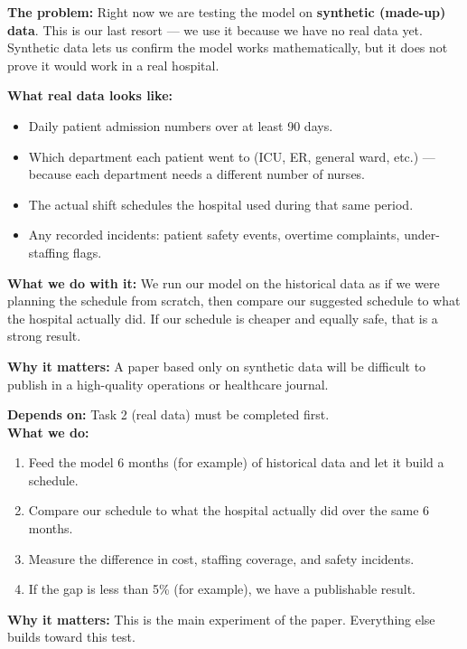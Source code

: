 \documentclass[12pt,a4paper]{article}
\begin{document}
\vspace{6pt}
\begin{warnbox}
\textbf{The problem:} Right now we are testing the model on \textbf{synthetic (made-up) data}. This is our last resort — we use it because we have no real data yet. Synthetic data lets us confirm the model works mathematically, but it does not prove it would work in a real hospital.

\textbf{What real data looks like:}
\begin{itemize}[itemsep=2pt]
  \item Daily patient admission numbers over at least 90 days.
  \item Which department each patient went to (ICU, ER, general ward, etc.) — because each department needs a different number of nurses.
  \item The actual shift schedules the hospital used during that same period.
  \item Any recorded incidents: patient safety events, overtime complaints, under-staffing flags.
\end{itemize}

\textbf{What we do with it:} We run our model on the historical data as if we were planning the schedule from scratch, then compare our suggested schedule to what the hospital actually did. If our schedule is cheaper and equally safe, that is a strong result.

\textbf{Why it matters:} A paper based only on synthetic data will be difficult to publish in a high-quality operations or healthcare journal.\\
\end{warnbox}

\vspace{6pt}
\begin{warnbox}
\textbf{Depends on:} Task 2 (real data) must be completed first.\\[4pt]
\textbf{What we do:}
\begin{enumerate}[itemsep=2pt]
  \item Feed the model 6 months (for example) of historical data and let it build a schedule.
  \item Compare our schedule to what the hospital actually did over the same 6 months.
  \item Measure the difference in cost, staffing coverage, and safety incidents.
  \item If the gap is less than 5\% (for example), we have a publishable result.
\end{enumerate}
\textbf{Why it matters:} This is the main experiment of the paper. Everything else builds toward this test.
\end{warnbox}
\end{document}
